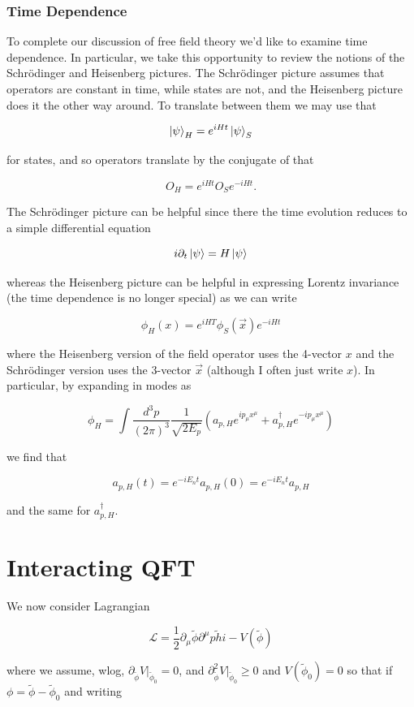 \documentclass{article}
\theoremstyle{definition}
\begin{document}
\subsubsection{Time Dependence}

To complete our discussion of free field theory we'd like to examine time
dependence. In particular, we take this opportunity to review the notions of the
Schr{\"o}dinger and Heisenberg pictures. The Schr{\"o}dinger picture assumes
that operators are constant in time, while states are not, and the Heisenberg
picture does it the other way around. To translate between them we may use that

$$ \ket{\psi}_H = e^{iHt} \ket{\psi}_S $$

for states, and so operators translate by the conjugate of that

$$ O_H = e^{iHt} O_S e^{-iHt}. $$

The Schr{\"o}dinger picture can be helpful since there the time evolution reduces to
a simple differential equation

$$ i \partial_t \ket{\psi} = H \ket{\psi} $$

whereas the Heisenberg picture can be helpful in expressing Lorentz invariance
(the time dependence is no longer special) as we can write

$$ \phi_H(x) = e^{iHT} \phi_S(\vec{x}) e^{-iHt} $$

where the Heisenberg version of the field operator uses the 4-vector $x$ and the
Schr{\"o}dinger version uses the 3-vector $\vec{x}$ (although I often just write
$x$). In particular, by expanding in modes as

$$ \phi_H = \int \frac{d^3p}{(2\pi)^3} \frac{1}{\sqrt{2 E_p}} (a_{p, H}
e^{ip_\mu x^\mu} + a^\dagger_{p, H} e^{-ip_\mu x^\mu}) $$

we find that

$$ a_{p, H}(t) = e^{-iE_n t} a_{p, H}(0) = e^{-iE_n t} a_{p, H} $$

and the same for $a_{p, H}^\dagger$.

\section{Interacting QFT}

We now consider Lagrangian

$$ \mathcal{L} = \frac{1}{2} \partial_\mu \tilde{\phi} \partial^\mu \tilde{phi}
- V(\tilde{\phi}) $$

where we assume, wlog, $\partial_{\tilde{\phi}} V |_{\tilde{\phi}_0} = 0$, and
$\partial^2_{\tilde{\phi}} V |_{\tilde{\phi}_0} \geq 0$ and $V(\tilde{\phi}_0) =
0$ so that if $\phi = \tilde{\phi} - \tilde{\phi}_0$ and writing
\end{document}
